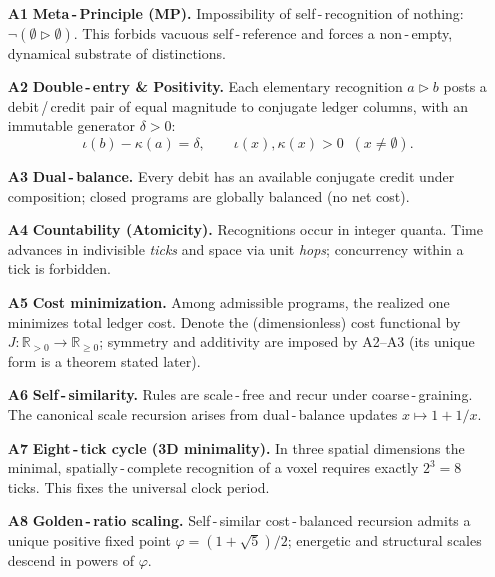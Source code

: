 \documentclass[11pt]{article}
\newcommand{\RR}{\mathbb{R}}
\newcommand{\ph}{\varphi}
\theoremstyle{remark}
\begin{document}
\begin{itemize}
  \item[\textbf{A1}] \textbf{Meta\,\mbox{-}\,Principle (MP).} \;Impossibility of self\,\mbox{-}\,recognition of nothing:
  $\neg(\emptyset \triangleright \emptyset)$. This forbids vacuous self\,\mbox{-}\,reference and forces a non\,\mbox{-}\,empty, dynamical substrate of distinctions.

  \item[\textbf{A2}] \textbf{Double\,\mbox{-}\,entry \& Positivity.} \;Each elementary recognition $a\triangleright b$ posts a
  debit\,/\,credit pair of equal magnitude to conjugate ledger columns, with an immutable
  generator $\delta>0$:
  \[
    \iota(b) - \kappa(a) = \delta, \qquad \iota(x),\kappa(x) > 0 \;\;(x\neq \emptyset).
  \]

  \item[\textbf{A3}] \textbf{Dual\,\mbox{-}\,balance.} \;Every debit has an available conjugate credit under composition; closed
  programs are globally balanced (no net cost).

  \item[\textbf{A4}] \textbf{Countability (Atomicity).} \;Recognitions occur in integer quanta. Time advances in indivisible
  \emph{ticks} and space via unit \emph{hops}; concurrency within a tick is forbidden.

  \item[\textbf{A5}] \textbf{Cost minimization.} \;Among admissible programs, the realized one minimizes total ledger cost.
  Denote the (dimensionless) cost functional by $J: \RR_{>0}\!\to\!\RR_{\ge 0}$; symmetry and additivity are imposed by
  A2--A3 (its unique form is a theorem stated later).

  \item[\textbf{A6}] \textbf{Self\,\mbox{-}\,similarity.} \;Rules are scale\,\mbox{-}\,free and recur under coarse\,\mbox{-}\,graining. The canonical
  scale recursion arises from dual\,\mbox{-}\,balance updates $x \mapsto 1 + 1/x$.

  \item[\textbf{A7}] \textbf{Eight\,\mbox{-}\,tick cycle (3D minimality).} \;In three spatial dimensions the minimal, spatially\,\mbox{-}\,complete
  recognition of a voxel requires exactly $2^{3}=8$ ticks. This fixes the universal clock period.

  \item[\textbf{A8}] \textbf{Golden\,\mbox{-}\,ratio scaling.} \;Self\,\mbox{-}\,similar cost\,\mbox{-}\,balanced recursion admits a unique positive fixed
  point $\ph = (1+\sqrt{5})/2$; energetic and structural scales descend in powers of $\ph$.
\end{itemize}
\end{document}
